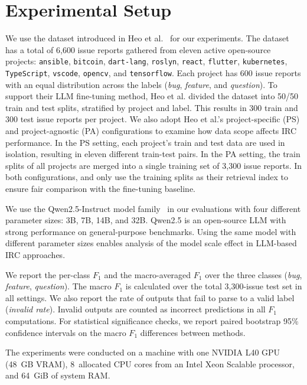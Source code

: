 \section{Experimental Setup}
\label{sec:setup}

\label{sec:setup-dataset}
We use the dataset introduced in Heo et al.~\cite{heo2025study} for our experiments. The dataset has a total of 6,600 issue reports gathered from eleven active open-source projects:
\texttt{ansible}, \texttt{bitcoin},
\texttt{dart-lang}, \texttt{roslyn},
\texttt{react}, \texttt{flutter},
\texttt{kubernetes}, \texttt{TypeScript},
\texttt{vscode}, \texttt{opencv}, and
\texttt{tensorflow}. Each project has 600 issue reports
with an equal distribution across the labels
(\emph{bug}, \emph{feature}, and \emph{question}). To support their LLM fine-tuning method, Heo et al. divided the dataset into 50/50 train and test
splits, stratified by project and label. This results in 300 train
and 300 test issue reports per project. We also adopt Heo et al.'s project-specific (PS) and project-agnostic (PA) configurations to examine how data scope affects IRC performance. In the PS setting, each project's train and test data are used in isolation, resulting in eleven different train-test pairs. In the PA setting, the train splits of all projects are merged into a single training set of 3,300 issue reports. In both configurations, \ragtag and \votag only use the training splits as their retrieval index to ensure fair comparison with the fine-tuning baseline.

\label{sec:setup-models}
We use the Qwen2.5-Instruct model family~\cite{yang2024qwen25} in our evaluations with four different parameter sizes: 3B, 7B, 14B, and 32B. Qwen2.5 is an open-source LLM with strong performance on general-purpose benchmarks. Using the same model with different parameter sizes enables analysis of the model scale effect in LLM-based IRC approaches.


\label{sec:setup-metrics}
We report the per-class $F_1$ and the macro-averaged $F_1$ over the three classes (\emph{bug}, \emph{feature}, \emph{question}). The macro $F_1$ is calculated over the total 3{,}300-issue test set in all settings. We also report the rate of outputs that fail to parse to a valid label (\textit{invalid rate}). Invalid outputs are counted as incorrect predictions in all $F_1$ computations. For statistical significance checks, we report paired bootstrap 95\% confidence intervals on the macro $F_1$ differences between methods.

\label{sec:setup-hardware}
The experiments were conducted on a machine with one NVIDIA L40 GPU (48~GB VRAM), 8~allocated CPU cores from an Intel Xeon Scalable processor, and 64~GiB of system RAM.
